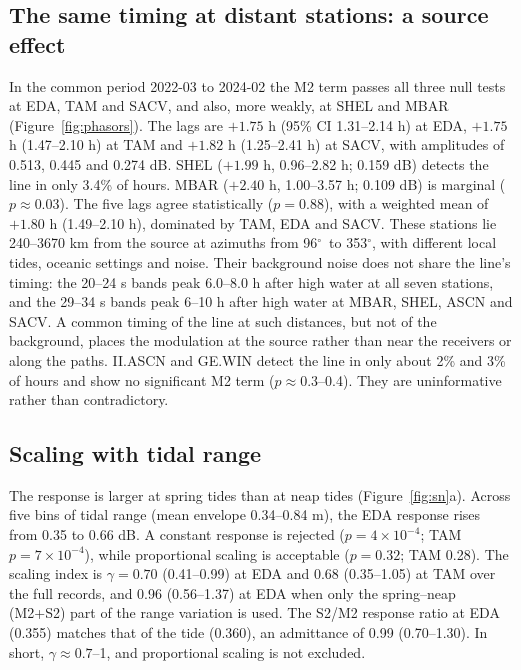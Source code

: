 \documentclass[11pt]{article}
\newcommand{\degr}{\ensuremath{^\circ}}
\begin{document}
\subsection{The same timing at distant stations: a source effect}
In the common period 2022-03 to 2024-02 the M2 term passes all three null tests at EDA, TAM and SACV, and also, more weakly, at SHEL and MBAR (Figure~\ref{fig:phasors}). The lags are $+1.75$ h (95\% CI 1.31--2.14 h) at EDA, $+1.75$ h (1.47--2.10 h) at TAM and $+1.82$ h (1.25--2.41 h) at SACV, with amplitudes of 0.513, 0.445 and 0.274 dB. SHEL ($+1.99$ h, 0.96--2.82 h; 0.159 dB) detects the line in only 3.4\% of hours. MBAR ($+2.40$ h, 1.00--3.57 h; 0.109 dB) is marginal ($p\approx0.03$). The five lags agree statistically ($p=0.88$), with a weighted mean of $+1.80$ h (1.49--2.10 h), dominated by TAM, EDA and SACV. These stations lie 240--3670 km from the source at azimuths from 96\degr\ to 353\degr, with different local tides, oceanic settings and noise. Their background noise does not share the line's timing: the 20--24 s bands peak 6.0--8.0 h after high water at all seven stations, and the 29--34 s bands peak 6--10 h after high water at MBAR, SHEL, ASCN and SACV. A common timing of the line at such distances, but not of the background, places the modulation at the source rather than near the receivers or along the paths. II.ASCN and GE.WIN detect the line in only about 2\% and 3\% of hours and show no significant M2 term ($p\approx0.3$--0.4). They are uninformative rather than contradictory.

\subsection{Scaling with tidal range}
The response is larger at spring tides than at neap tides (Figure~\ref{fig:sn}a). Across five bins of tidal range (mean envelope 0.34--0.84 m), the EDA response rises from 0.35 to 0.66 dB. A constant response is rejected ($p=4\times10^{-4}$; TAM $p=7\times10^{-4}$), while proportional scaling is acceptable ($p=0.32$; TAM 0.28). The scaling index is $\gamma=0.70$ (0.41--0.99) at EDA and 0.68 (0.35--1.05) at TAM over the full records, and 0.96 (0.56--1.37) at EDA when only the spring--neap (M2+S2) part of the range variation is used. The S2/M2 response ratio at EDA (0.355) matches that of the tide (0.360), an admittance of 0.99 (0.70--1.30). In short, $\gamma\approx0.7$--1, and proportional scaling is not excluded.
\end{document}
